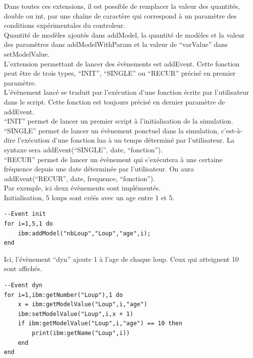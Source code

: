 Dans toutes ces extensions, il est possible de remplacer la valeur des quantités, double ou int, par une chaîne de caractère qui correspond à un paramètre des conditions expérimentales du controleur.\\
Quantité de modèles ajoutés dans addModel, la quantité de modèles et la valeur des paramètres dans addModelWithParam et la valeur de ``varValue'' dans setModelValue.\\

L'extension permettant de lancer des évènements est addEvent. Cette fonction peut être de trois types, ``INIT'', ``SINGLE'' ou ``RECUR'' précisé en premier paramètre. \\
L'évènement lancé se traduit par l'exécution d'une fonction écrite par l'utilisateur dans le script. Cette fonction est toujours précisé en dernier paramètre de addEvent.\\
``INIT'' permet de lancer un premier script à l'initialisation de la simulation.\\
``SINGLE'' permet de lancer un évènement ponctuel dans la simulation, c'est-à-dire l'exécution d'une fonction lua à un temps déterminé par l'utilisateur. La syntaxe sera addEvent(``SINGLE'', date, ``fonction'').\\
``RECUR'' permet de lancer un évènement qui s'exécutera à une certaine fréquence depuis une date déterminée par l'utilisateur. On aura addEvent(``RECUR'', date, frequence, ``fonction'').\\

Par exemple, ici deux évènements sont implémentés.\\
Initialisation, 5 loups sont créés avec un age entre 1 et 5.


\begin{lstlisting}[frame=single]
--Event init
for i=1,5,1 do
	ibm:addModel("nbLoup","Loup","age",i);
end
\end{lstlisting}

Ici, l'évènement ``dyn'' ajoute 1 à l'age de chaque loup. Ceux qui atteignent 10 sont affichés.
\begin{lstlisting}[frame=single]
--Event dyn
for i=1,ibm:getNumber("Loup"),1 do
	x = ibm:getModelValue("Loup",i,"age")
	ibm:setModelValue("Loup",i,x + 1)
	if ibm:getModelValue("Loup",i,"age") == 10 then
		print(ibm:getName("Loup",i))
	end
end
\end{lstlisting}


